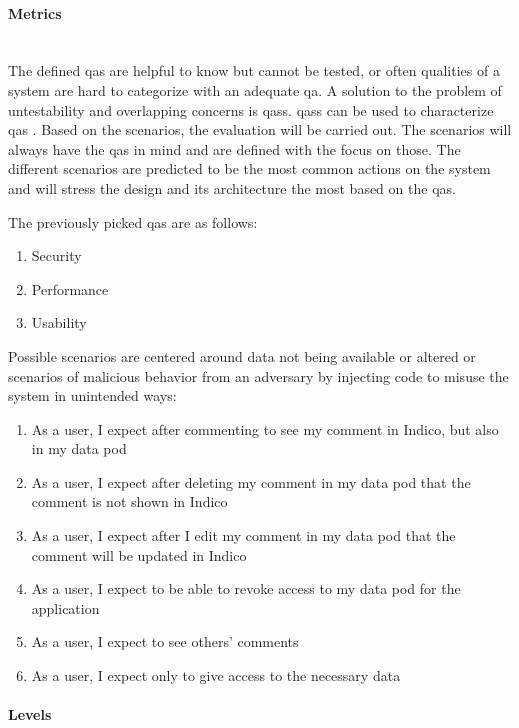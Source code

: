 \vspace{0.5cm}
\paragraph{Metrics}\mbox{}\\

The defined \glspl{qa} are helpful to know but cannot be tested, or often qualities of a system are hard to categorize with an adequate \gls{qa}. A solution to the problem of untestability and overlapping concerns is \glspl{qas}. \glspl{qas} can be used to characterize \glspl{qa} \cite{BassSoftwareArchitecture2003}. Based on the scenarios, the evaluation will be carried out. The scenarios will always have the \glspl{qa} in mind and are defined with the focus on those. The different scenarios are predicted to be the most common actions on the system and will stress the design and its architecture the most based on the \glspl{qa}.

The previously picked \glspl{qa} are as follows:

\begin{enumerate}
    \item Security
    \item Performance
    \item Usability
\end{enumerate}

Possible scenarios are centered around data not being available or altered or scenarios of malicious behavior from an adversary by injecting code to misuse the system in unintended ways:

\begin{enumerate}
    \item As a user, I expect after commenting to see my comment in Indico, but also in my data pod
    \item As a user, I expect after deleting my comment in my data pod that the comment is not shown in Indico
    \item As a user, I expect after I edit my comment in my data pod that the comment will be updated in Indico
    \item As a user, I expect to be able to revoke access to my data pod for the application
    \item As a user, I expect to see others' comments
    \item As a user, I expect only to give access to the necessary data
\end{enumerate}

\paragraph{Levels}\label{poc1-levels}\mbox{}\\

